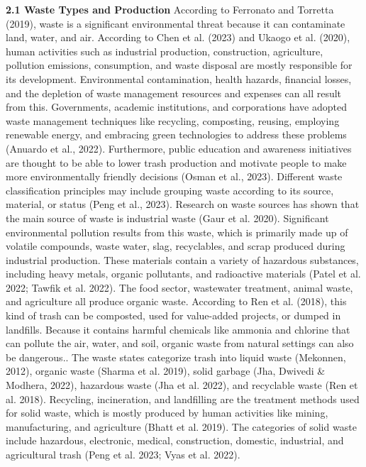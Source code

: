 \documentclass[a4paper,11pt,onecolumn]{article}
\begin{document}
\textbf{2.1 Waste Types and Production}\newline
According to Ferronato and Torretta (2019), waste is a significant environmental threat because it can contaminate land, water, and air. According to Chen et al. (2023) and Ukaogo et al. (2020), human activities such as industrial production, construction, agriculture, pollution emissions, consumption, and waste disposal are mostly responsible for its development. Environmental contamination, health hazards, financial losses, and the depletion of waste management resources and expenses can all result from this. Governments, academic institutions, and corporations have adopted waste management techniques like recycling, composting, reusing, employing renewable energy, and embracing green technologies to address these problems (Anuardo et al., 2022). Furthermore, public education and awareness initiatives are thought to be able to lower trash production and motivate people to make more environmentally friendly decisions (Osman et al., 2023).\newline
Different waste classification principles may include grouping waste according to its source, material, or status (Peng et al., 2023). Research on waste sources has shown that the main source of waste is industrial waste (Gaur et al. 2020). Significant environmental pollution results from this waste, which is primarily made up of volatile compounds, waste water, slag, recyclables, and scrap produced during industrial production. These materials contain a variety of hazardous substances, including heavy metals, organic pollutants, and radioactive materials (Patel et al. 2022; Tawfik et al. 2022).\newline
The food sector, wastewater treatment, animal waste, and agriculture all produce organic waste. According to Ren et al. (2018), this kind of trash can be composted, used for value-added projects, or dumped in landfills. Because it contains harmful chemicals like ammonia and chlorine that can pollute the air, water, and soil, organic waste from natural settings can also be dangerous.\newline. The waste states categorize trash into liquid waste (Mekonnen, 2012), organic waste (Sharma et al. 2019), solid garbage (Jha, Dwivedi & Modhera, 2022), hazardous waste (Jha et al. 2022), and recyclable waste (Ren et al. 2018). Recycling, incineration, and landfilling are the treatment methods used for solid waste, which is mostly produced by human activities like mining, manufacturing, and agriculture (Bhatt et al. 2019). The categories of solid waste include hazardous, electronic, medical, construction, domestic, industrial, and agricultural trash (Peng et al. 2023; Vyas et al. 2022). \newline
\end{document}
